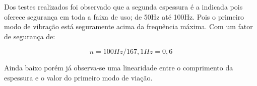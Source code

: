 Dos testes realizados foi observado que a segunda espessura é a indicada pois oferece segurança em toda a faixa de uso; de 50Hz até 100Hz. Pois o primeiro modo de vibração está seguramente acima da frequência máxima. Com um fator de segurança de:

    \begin{equation}
            n = 100 Hz/167,1 Hz = 0,6
    \end{equation}

Ainda baixo porém já observa-se uma linearidade entre o comprimento da espessura e o valor do primeiro modo de viação.
